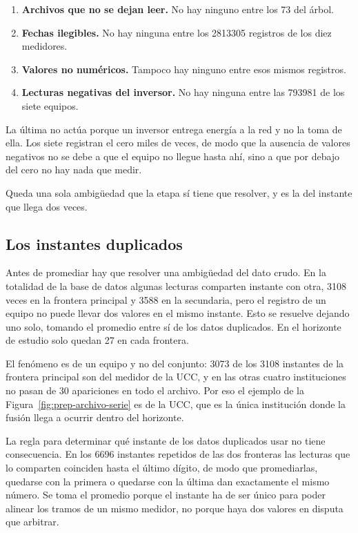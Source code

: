\begin{enumerate}[leftmargin=*, itemsep=0.35em]
 \item \textbf{Archivos que no se dejan leer.} No hay ninguno entre los 73
 del árbol.

 \item \textbf{Fechas ilegibles.} No hay ninguna entre los \num{2813305}
 registros de los diez medidores.

 \item \textbf{Valores no numéricos.} Tampoco hay ninguno entre esos mismos
 registros.

 \item \textbf{Lecturas negativas del inversor.} No hay ninguna entre las
 \num{793981} de los siete equipos.
\end{enumerate}

La última no actúa porque un inversor entrega energía a la red y no la toma
de ella. Los siete registran el cero miles de veces, de modo que la
ausencia de valores negativos no se debe a que el equipo no llegue hasta
ahí, sino a que por debajo del cero no hay nada que medir.

Queda una sola ambigüedad que la etapa sí tiene que resolver, y es la del
instante que llega dos veces.

\subsection{Los instantes duplicados}
\label{sub:prep-duplicados}

Antes de promediar hay que resolver una ambigüedad del dato crudo. En la totalidad de la base de datos algunas
lecturas comparten instante con otra, \num{3108} veces en la frontera
principal y \num{3588} en la secundaria, pero el registro de un equipo no
puede llevar dos valores en el mismo instante. Esto se resuelve dejando uno solo,
tomando el promedio entre sí de los datos duplicados. En el horizonte de estudio solo quedan 27 en cada frontera.

El fenómeno es de un equipo y no del conjunto: \num{3073} de los
\num{3108} instantes de la frontera principal son del medidor de la UCC, y
en las otras cuatro instituciones no pasan de 30 apariciones en todo el
archivo. Por eso el ejemplo de la Figura~\ref{fig:prep-archivo-serie} es de
la UCC, que es la única institución donde la fusión llega a ocurrir dentro
del horizonte.

La regla para determinar qué instante de los datos duplicados usar no tiene consecuencia. En los \num{6696} instantes repetidos de las dos fronteras las
lecturas que lo comparten coinciden hasta el último dígito, de modo que
promediarlas, quedarse con la primera o quedarse con la última dan
exactamente el mismo número. Se toma el promedio porque el instante ha de ser único para poder alinear los tramos
de un mismo medidor, no porque haya dos valores en disputa que arbitrar.

